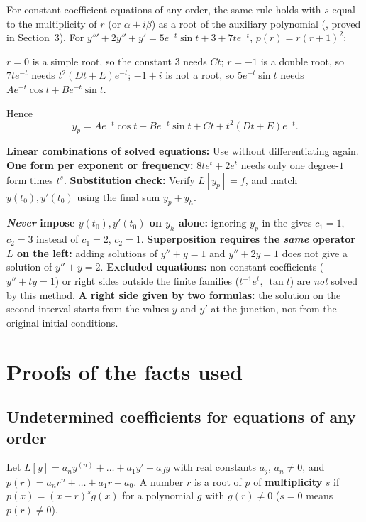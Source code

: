 \documentclass[10pt]{scrartcl}
\begin{document}
\begin{example*}
  For constant-coefficient equations of any order, the same rule holds with $s$ equal to the multiplicity of $r$ (or $\alpha+i\beta$) as a root of the auxiliary polynomial (, proved in Section~3). For $y'''+2y''+y'=5e^{-t}\sin t+3+7te^{-t}$, $p(r)=r(r+1)^2$:
  \begin{itemize}
    \ii $r=0$ is a simple root, so the constant $3$ needs $Ct$;
    \ii $r=-1$ is a double root, so $7te^{-t}$ needs $t^2(Dt+E)e^{-t}$;
    \ii $-1+i$ is not a root, so $5e^{-t}\sin t$ needs $Ae^{-t}\cos t+Be^{-t}\sin t$.
  \end{itemize}
  Hence
  \[
    y_p = Ae^{-t}\cos t+Be^{-t}\sin t + Ct + t^2(Dt+E)e^{-t}.
  \]
\end{example*}

\begin{shortcuts}
  \ii \textbf{Linear combinations of solved equations:} Use  without differentiating again.
  \ii \textbf{One form per exponent or frequency:} $8te^t+2e^t$ needs only one degree-$1$ form times $t^s$.
  \ii \textbf{Substitution check:} Verify $L[y_p]=f$, and match $y(t_0), y'(t_0)$ using the final sum $y_p+y_h$.
\end{shortcuts}

\begin{trapbox}
  \ii \textbf{\emph{Never} impose $y(t_0), y'(t_0)$ on $y_h$ alone:} ignoring $y_p$ in the  gives $c_1=1$, $c_2=3$ instead of $c_1=2$, $c_2=1$.
  \ii \textbf{Superposition requires the \emph{same} operator $L$ on the left:} adding solutions of $y''+y=1$ and $y''+2y=1$ does not give a solution of $y''+y=2$.
  \ii \textbf{Excluded equations:} non-constant coefficients ($y''+ty=1$) or right sides outside the finite families ($t^{-1}e^t,\ \tan t$) are \emph{not} solved by this method.
  \ii \textbf{A right side given by two formulas:} the solution on the second interval starts from the values $y$ and $y'$ at the junction, not from the original initial conditions.
\end{trapbox}

\section{Proofs of the facts used}

\subsection{Undetermined coefficients for equations of any order}
Let $L[y]=a_ny^{(n)}+\dots+a_1y'+a_0y$ with real constants $a_j$, $a_n\neq 0$, and $p(r)=a_nr^n+\dots+a_1r+a_0$. A number $r$ is a root of $p$ of \textbf{multiplicity} $s$ if $p(x)=(x-r)^sg(x)$ for a polynomial $g$ with $g(r)\neq 0$ ($s=0$ means $p(r)\neq 0$).
\end{document}
